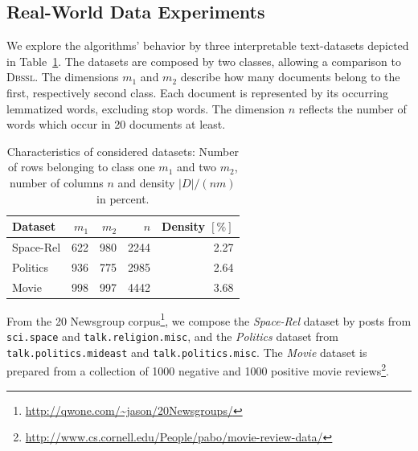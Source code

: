 \subsection{Real-World Data Experiments}
We explore the algorithms' behavior by three interpretable text-datasets depicted in Table~\ref{tbl:CS:datasets}. The datasets are composed by two classes, allowing a comparison to \textsc{Dbssl}. The dimensions $m_1$ and $m_2$ describe how many documents belong to the first, respectively second class. Each document is represented by its occurring lemmatized words, excluding stop words. The dimension $n$ reflects the number of words which occur in 20 documents at least.
\begin{table}[!t]
 	\centering
 	\begin{tabular}{l@{\hskip 0.1in}r@{\hskip 0.1in}r@{\hskip 0.1in}r@{\hskip 0.1in}r}\toprule
     Dataset & $m_1$ & $m_2$ & $n$ & Density $[\%]$\\
     \midrule
     Space-Rel & 622 & 980 & 2244 & 2.27\\
     Politics & 936 & 775 & 2985 & 2.64\\
     Movie & 998 & 997 & 4442 & 3.68\\ \bottomrule
     \end{tabular}
     \caption{Characteristics of considered datasets: Number of rows belonging to class one $m_1$ and two $m_2$, number of columns $n$ and density $|D|/(nm)$ in percent.}
   \label{tbl:CS:datasets}
\end{table}
From the 20 Newsgroup corpus\footnote{\url{http://qwone.com/~jason/20Newsgroups/}}, we compose the \emph{Space-Rel} dataset by posts from \texttt{sci.space} and \texttt{talk.religion.misc}, and the \emph{Politics} dataset from \texttt{talk.politics.mideast} and \texttt{talk.politics.misc}. The \emph{Movie} dataset is prepared from a collection of 1000 negative and 1000 positive movie reviews\footnote{\url{http://www.cs.cornell.edu/People/pabo/movie-review-data/}}.

